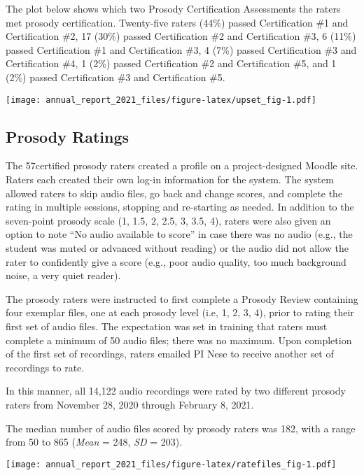 \documentclass[
]{article}
\begin{document}
The plot below shows which two Prosody Certification Assessments the
raters met prosody certification. Twenty-five raters (44\%) passed
Certification \#1 and Certification \#2, 17 (30\%) passed Certification
\#2 and Certification \#3, 6 (11\%) passed Certification \#1 and
Certification \#3, 4 (7\%) passed Certification \#3 and Certification
\#4, 1 (2\%) passed Certification \#2 and Certification \#5, and 1 (2\%)
passed Certification \#3 and Certification \#5.

\texttt{[image: annual\_report\_2021\_files/figure-latex/upset\_fig-1.pdf]}

\hypertarget{prosody-ratings}{%
\subsection{Prosody Ratings}\label{prosody-ratings}}

The 57certified prosody raters created a profile on a project-designed
Moodle site. Raters each created their own log-in information for the
system. The system allowed raters to skip audio files, go back and
change scores, and complete the rating in multiple sessions, stopping
and re-starting as needed. In addition to the seven-point prosody scale
(1, 1.5, 2, 2.5, 3, 3.5, 4), raters were also given an option to note
``No audio available to score'' in case there was no audio (e.g., the
student was muted or advanced without reading) or the audio did not
allow the rater to confidently give a score (e.g., poor audio quality,
too much background noise, a very quiet reader).

The prosody raters were instructed to first complete a Prosody Review
containing four exemplar files, one at each prosody level (i.e, 1, 2, 3,
4), prior to rating their first set of audio files. The expectation was
set in training that raters must complete a minimum of 50 audio files;
there was no maximum. Upon completion of the first set of recordings,
raters emailed PI Nese to receive another set of recordings to rate.

In this manner, all 14,122 audio recordings were rated by two different
prosody raters from November 28, 2020 through February 8, 2021.

The median number of audio files scored by prosody raters was 182, with
a range from 50 to 865 (\emph{Mean} = 248, \emph{SD} = 203).

\texttt{[image: annual\_report\_2021\_files/figure-latex/ratefiles\_fig-1.pdf]}
\end{document}
